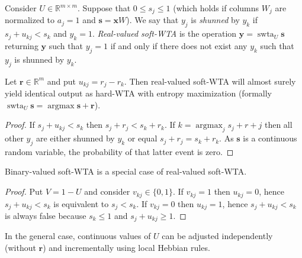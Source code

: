 \documentclass[oneside,english,logo]{amuthesis}
\DeclareMathOperator*{\argmax}{argmax}
\DeclareMathOperator{\swta}{swta}
\begin{document}
\begin{definition}
Consider $U \in \mathbb{R}^{m\times m}$. Suppose that $0\le s_j\le 1$ (which holds if columns $W_j$ are normalized to $a_j=1$ and $\boldsymbol{s}=\boldsymbol{x} W$). 
We say that $y_j$ is \textit{shunned} by $y_k$ if $s_j+u_{kj}<s_k$ and $y_k=1$. 
\textit{Real-valued soft-WTA} is the operation $\boldsymbol{y}=\swta_U \boldsymbol{s}$ returning $\boldsymbol{y}$ such that $y_j=1$ if and only if there does not exist any $y_k$ such that  $y_j$ is shunned by $y_k$.
\end{definition}
\begin{theorem}
Let $\boldsymbol{r}\in \mathbb{R}^m$ and put $u_{kj}=r_j-r_k$. Then real-valued soft-WTA will almost surely yield identical output as hard-WTA with entropy maximization (formally $\swta_U \boldsymbol{s}= \argmax \boldsymbol{s}+\boldsymbol{r}$). 
\end{theorem}
\begin{proof}
If $s_j+u_{kj}<s_k$ then $s_j+r_j<s_k+r_k$. If $k=\argmax_j s_j+r+j$ then all other $y_j$ are either shunned by $y_k$ or equal $s_j+r_j=s_k+r_k$. As $\boldsymbol{s}$ is a continuous random variable, the probability of that latter event is zero.
\end{proof}
\begin{theorem}
Binary-valued soft-WTA is a special case of real-valued soft-WTA. 
\end{theorem}
\begin{proof}
Put $V=1-U$ and consider $v_{kj} \in \{0,1\}$. If $v_{kj}=1$ then $u_{kj}=0$, hence $s_j+u_{kj}<s_k$ is equivalent to $s_j<s_k$. If $v_{kj}=0$ then $u_{kj}=1$, hence $s_j+u_{kj}<s_k$ is always false because $s_k \le  1$ and $s_j+u_{kj} \ge 1$. 
\end{proof}

In the general case, continuous values of $U$ can be adjusted independently (without $\boldsymbol{r}$) and incrementally using local Hebbian rules. 
\end{document}
